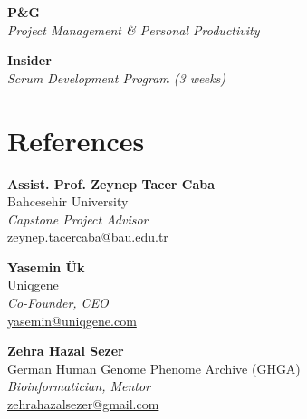 \documentclass[a4paper,10pt]{article}
\newcommand{\sepspace}{\noindent\makebox[\linewidth]{\rule{\textwidth}{0.4pt}}}
\begin{document}
\vspace{0.3cm}

\noindent\textbf{P\&G} \\
\textit{Project Management \& Personal Productivity}

\vspace{0.3cm}

\noindent\textbf{Insider} \\
\textit{Scrum Development Program (3 weeks)}

\sepspace

\section*{References}
\vspace{0.3cm}

\noindent\textbf{Assist. Prof. Zeynep Tacer Caba} \\
Bahcesehir University \\
\textit{Capstone Project Advisor} \\
\href{mailto:zeynep.tacercaba@bau.edu.tr}{zeynep.tacercaba@bau.edu.tr}

\vspace{0.3cm}

\noindent\textbf{Yasemin Ük} \\
Uniqgene \\
\textit{Co-Founder, CEO} \\
\href{mailto:yasemin@uniqgene.com}{yasemin@uniqgene.com}

\vspace{0.3cm}

\noindent\textbf{Zehra Hazal Sezer} \\
German Human Genome Phenome Archive (GHGA) \\
\textit{Bioinformatician, Mentor} \\
\href{mailto:zehrahazalsezer@gmail.com}{zehrahazalsezer@gmail.com}
\end{document}

